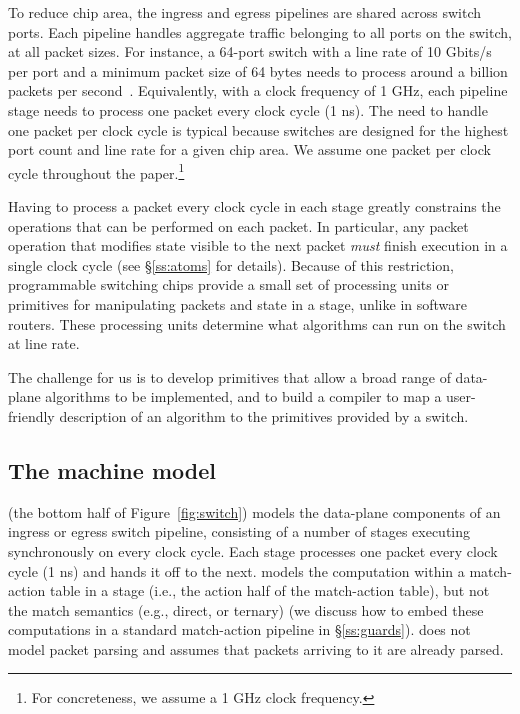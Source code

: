 To reduce chip area, the ingress and egress pipelines are shared across switch
ports.  Each pipeline handles aggregate traffic belonging to all ports on the
switch, at all packet sizes.  For instance, a 64-port switch with a line rate
of 10 Gbits/s per port and a minimum packet size of 64 bytes needs to process
around a billion packets per second~\cite{rmt}.  Equivalently, with a clock
frequency of 1 GHz, each pipeline stage needs to process one packet every clock
cycle (1 ns).  The need to handle one packet per clock cycle is typical because
switches are designed for the highest port count and line rate for a given chip
area. We assume one packet per clock cycle throughout the paper.\footnote{For
concreteness, we assume a 1 GHz clock frequency.}

Having to process a packet every clock cycle in each stage greatly
constrains the operations that can be performed on each packet. In
particular, any packet operation that modifies state visible to the
next packet {\em must} finish execution in a single clock cycle (see
\S\ref{ss:atoms} for details). Because of this restriction,
programmable switching chips provide a small set of processing units
or primitives for manipulating packets and state in a stage, unlike in
software routers. These processing units determine what algorithms can
run on the switch at line rate.

The challenge for us is to develop primitives that allow a broad range of
data-plane algorithms to be implemented, and to build a compiler to map a
user-friendly description of an algorithm to the primitives provided by a
switch.

\subsection{The \absmachine machine model}

\absmachine (the bottom half of Figure~\ref{fig:switch}) models the data-plane
components of an ingress or egress switch pipeline, consisting of a number of
stages executing synchronously on every clock cycle. Each stage processes one
packet every clock cycle (1 ns) and hands it off to the next. \absmachine
models the computation within a match-action table in a stage (i.e., the action
half of the match-action table), but not the match semantics (e.g., direct, or
ternary) (we discuss how to embed these computations in a standard match-action
pipeline in \S\ref{ss:guards}).  \absmachine does not model packet parsing and
assumes that packets arriving to it are already parsed.

